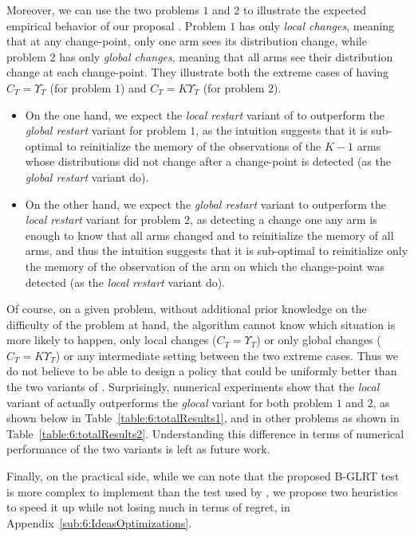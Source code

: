 Moreover, we can use the two problems $1$ and $2$ to illustrate the expected empirical behavior of our proposal \GLRklUCB.
Problem $1$ has only \emph{local changes}, meaning that at any change-point, only one arm sees its distribution change, while problem $2$ has only \emph{global changes}, meaning that all arms see their distribution change at each change-point.
They illustrate both the extreme cases of having $C_T = \Upsilon_T$ (for problem $1$) and $C_T = K \Upsilon_T$ (for problem $2$).
\begin{itemize}
    \item
On the one hand, we expect the \emph{local restart} variant of \GLRklUCB{} to outperform the \emph{global restart} variant for problem $1$, as the intuition suggests that it is sub-optimal to reinitialize the memory of the observations of the $K-1$ arms whose distributions did not change after a change-point is detected (as the \emph{global restart} variant do).
    \item
On the other hand, we expect the \emph{global restart} variant to outperform the \emph{local restart} variant for problem $2$, as detecting a change one any arm is enough to know that all arms changed and to reinitialize the memory of all arms, and thus the intuition suggests that it is sub-optimal to reinitialize only the memory of the observation of the arm on which the change-point was detected (as the \emph{local restart} variant do).
\end{itemize}
%
Of course, on a given problem, without additional prior knowledge on the difficulty of the problem at hand, the algorithm cannot know which situation is more likely to happen, only local changes ($C_T = \Upsilon_T$) or only global changes ($C_T = K \Upsilon_T$) or any intermediate setting between the two extreme cases.
Thus we do not believe to be able to design a policy that could be uniformly better than the two variants of \GLRklUCB.
%
Surprisingly, numerical experiments show that the \emph{local} variant of \GLRklUCB{} actually outperforms the \emph{glocal} variant for both problem $1$ and $2$, as shown below in Table~\ref{table:6:totalResults1}, and in other problems as shown in Table~\ref{table:6:totalResults2}.
%
Understanding this difference in terms of numerical performance of the two variants is left as future work.

Finally, on the practical side, while we can note that the proposed B-GLRT test is more complex to implement than the test used by \MUCB, we propose two heuristics to speed it up while not losing much in terms of regret, in Appendix~\ref{sub:6:IdeasOptimizations}.


